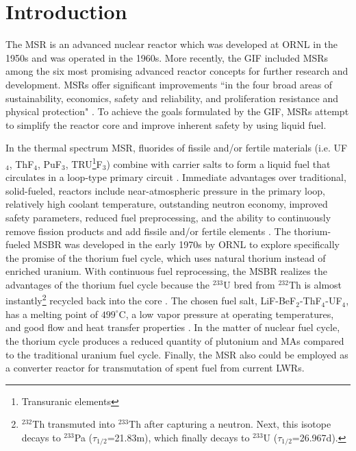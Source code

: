 \section{Introduction}
The \gls{MSR} is an advanced nuclear reactor which was developed at \gls{ORNL} 
in the 1950s and was operated in the 1960s. More recently, the \gls{GIF}  
included \glspl{MSR} among the six most promising advanced reactor concepts for 
further research and development. 
\glspl{MSR} offer significant improvements ``in the four broad areas of 
sustainability, economics, safety and reliability, and proliferation resistance 
and physical protection" \cite{doe_technology_2002}. To achieve the goals 
formulated by the GIF, \glspl{MSR} attempt to simplify the reactor core and 
improve inherent safety by using liquid fuel.

In the thermal spectrum \gls{MSR}, fluorides of fissile and/or fertile 
materials (i.e. UF$_4$, ThF$_4$,  PuF$_3$, TRU\footnote{ Transuranic 
elements}F$_3$) combine with carrier salts to form a liquid fuel that 
circulates in a loop-type primary circuit \cite{haubenreich_experience_1970}. 
Immediate advantages over traditional, solid-fueled, reactors include 
near-atmospheric pressure in the primary loop, 
relatively high coolant temperature, outstanding neutron economy, improved 
safety parameters, reduced fuel preprocessing, and the ability to continuously 
remove fission products and add fissile and/or fertile elements 
\cite{leblanc_molten_2010}. The thorium-fueled \gls{MSBR} was developed in the 
early 1970s by \gls{ORNL} to explore specifically the promise of the thorium 
fuel cycle, which uses natural thorium instead of enriched uranium. With 
continuous fuel reprocessing, the \gls{MSBR} realizes the advantages of the 
thorium fuel cycle because the $^{233}$U bred from 
$^{232}$Th is almost instantly\footnote{\space $^{232}$Th transmuted into 
$^{233}$Th after capturing a neutron. Next, this isotope decays to $^{233}$Pa 
($\tau_{1/2}$=21.83m), which finally decays to $^{233}$U 
($\tau_{1/2}$=26.967d).} recycled back into the core 
\cite{betzler_modeling_2016}. The chosen fuel salt, LiF-BeF$_2$-ThF$_4$-UF$_4$, has a 
melting point of $499^\circ$C, a low vapor pressure at operating temperatures, 
and good flow and heat transfer properties \cite{robertson_conceptual_1971}. In 
the matter of nuclear fuel cycle, the thorium cycle produces a reduced quantity 
of plutonium and \glspl{MA} compared to the traditional uranium fuel cycle. 
Finally, the \gls{MSR} also could be employed as a converter reactor for 
transmutation of spent fuel from current \glspl{LWR}.

